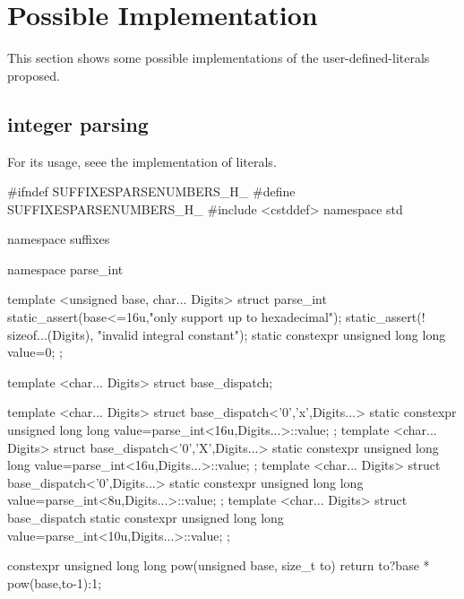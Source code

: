 \documentclass[ebook,11pt,article]{memoir}
\begin{document}
\chapter{Possible Implementation}
This section shows some possible implementations of the user-defined-literals proposed.
\section{integer parsing}
For its usage, seee the implementation of  literals.
\begin{codeblock}
#ifndef SUFFIXESPARSENUMBERS_H_
#define SUFFIXESPARSENUMBERS_H_
#include <cstddef>
namespace std {
namespace suffixes {
namespace parse_int {

template <unsigned base, char... Digits>
struct parse_int{
    static_assert(base<=16u,"only support up to hexadecimal");
    static_assert(! sizeof...(Digits), "invalid integral constant");
    static constexpr unsigned long long value=0;
};

template <char... Digits>
struct base_dispatch;

template <char... Digits>
struct base_dispatch<'0','x',Digits...>{
    static constexpr unsigned long long value=parse_int<16u,Digits...>::value;
};
template <char... Digits>
struct base_dispatch<'0','X',Digits...>{
    static constexpr unsigned long long value=parse_int<16u,Digits...>::value;
};
template <char... Digits>
struct base_dispatch<'0',Digits...>{
    static constexpr unsigned long long value=parse_int<8u,Digits...>::value;
};
template <char... Digits>
struct base_dispatch{
    static constexpr unsigned long long value=parse_int<10u,Digits...>::value;
};

constexpr unsigned long long
pow(unsigned base, size_t to) {
    return to?base * pow(base,to-1):1;
}

}}}
\end{codeblock}
\end{document}
